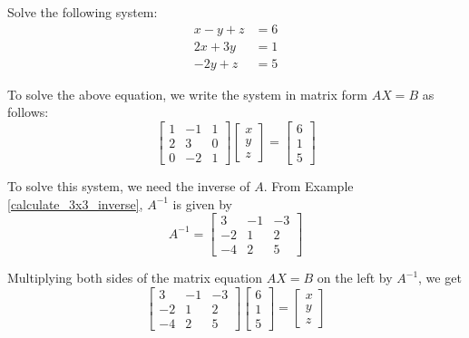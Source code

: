 \begin{example}
    Solve the following system:
    \begin{align*}
        x - y + z & = 6 \\
        2x + 3y   & = 1 \\
        -2y + z   & = 5
    \end{align*}
\end{example}

\begin{solution}
    To solve the above equation, we write the system in matrix form \( AX = B \) as follows:
    \[ \left[
            \begin{array}{ccc}
                1 & -1 & 1 \\
                2 & 3  & 0 \\
                0 & -2 & 1
            \end{array}
            \right]
        \left[
            \begin{array}{c}
                x \\
                y \\
                z
            \end{array}
            \right] =
        \left[
            \begin{array}{c}
                6 \\
                1 \\
                5
            \end{array}
            \right] \]

    To solve this system, we need the inverse of \( A \). From Example \ref{calculate_3x3_inverse}, \( A^{-1} \) is given by
    \[ A^{-1} = \left[
            \begin{array}{ccc}
                3  & -1 & -3 \\
                -2 & 1  & 2  \\
                -4 & 2  & 5
            \end{array}
            \right] \]

    Multiplying both sides of the matrix equation \( AX = B \) on the left by \( A^{-1} \), we get
    \[ \left[
            \begin{array}{ccc}
                3  & -1 & -3 \\
                -2 & 1  & 2  \\
                -4 & 2  & 5
            \end{array}
            \right]
        \left[
            \begin{array}{c}
                6 \\
                1 \\
                5
            \end{array}
            \right] =
        \left[
            \begin{array}{c}
                x \\
                y \\
                z
            \end{array}
            \right] \]


\end{solution}
